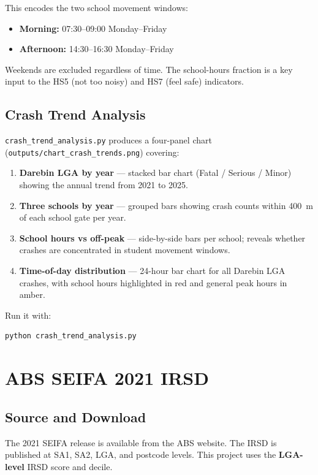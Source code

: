 \documentclass[11pt,a4paper,openany]{book}
\begin{document}
This encodes the two school movement windows:
\begin{itemize}
  \item \textbf{Morning:} 07:30--09:00 Monday--Friday
  \item \textbf{Afternoon:} 14:30--16:30 Monday--Friday
\end{itemize}

Weekends are excluded regardless of time. The school-hours fraction is a key input to the HS5 (not too noisy) and HS7 (feel safe) indicators.

\subsection{Crash Trend Analysis}

\texttt{crash\_trend\_analysis.py} produces a four-panel chart (\texttt{outputs/chart\_crash\_trends.png}) covering:

\begin{enumerate}
  \item \textbf{Darebin LGA by year} --- stacked bar chart (Fatal / Serious / Minor) showing the annual trend from 2021 to 2025.
  \item \textbf{Three schools by year} --- grouped bars showing crash counts within 400~m of each school gate per year.
  \item \textbf{School hours vs off-peak} --- side-by-side bars per school; reveals whether crashes are concentrated in student movement windows.
  \item \textbf{Time-of-day distribution} --- 24-hour bar chart for all Darebin LGA crashes, with school hours highlighted in red and general peak hours in amber.
\end{enumerate}

Run it with:
\begin{lstlisting}[style=bash]
python crash_trend_analysis.py
\end{lstlisting}

\section{ABS SEIFA 2021 IRSD}

\subsection{Source and Download}

The 2021 SEIFA release is available from the ABS website. The IRSD is published at SA1, SA2, LGA, and postcode levels. This project uses the \textbf{LGA-level} IRSD score and decile.
\end{document}
